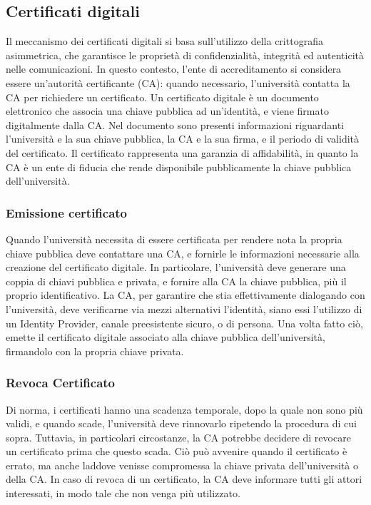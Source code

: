 \documentclass[a4paper,12pt]{article}
\begin{document}
\subsection{Certificati digitali} 
Il meccanismo dei certificati digitali si basa sull'utilizzo della crittografia asimmetrica, che garantisce le proprietà di confidenzialità, integrità ed autenticità nelle comunicazioni. 
In questo contesto, l'ente di accreditamento si considera essere un'autorità certificante (CA): quando necessario, l'università contatta la CA per richiedere un certificato.
\newline
Un certificato digitale è un documento elettronico che associa una chiave pubblica ad un'identità, e viene firmato digitalmente dalla CA. Nel documento sono presenti informazioni riguardanti l'università e la sua chiave pubblica, la CA e la sua firma, e il periodo di validità del certificato. Il certificato rappresenta una garanzia di affidabilità, in quanto la CA è un ente di fiducia che rende disponibile pubblicamente la chiave pubblica dell'università.
\subsubsection{Emissione certificato} Quando l'università necessita di essere certificata per rendere nota la propria chiave pubblica deve contattare una CA, e fornirle le informazioni necessarie alla creazione del certificato digitale. In particolare, l'università deve generare una coppia di chiavi pubblica e privata, e fornire alla CA la chiave pubblica, più il proprio identificativo. La CA, per garantire che stia effettivamente dialogando con l'università, deve verificarne via mezzi alternativi l'identità, siano essi l'utilizzo di un Identity Provider, canale preesistente sicuro, o di persona. Una volta fatto ciò, emette il certificato digitale associato alla chiave pubblica dell'università, firmandolo con la propria chiave privata.
\subsubsection{Revoca Certificato} Di norma, i certificati hanno una scadenza temporale, dopo la quale non sono più validi, e quando scade, l'università deve rinnovarlo ripetendo la procedura di cui sopra. Tuttavia, in particolari circostanze, la CA potrebbe decidere di revocare un certificato prima che questo scada. Ciò può avvenire quando il certificato è errato, ma anche laddove venisse compromessa la chiave privata dell'università o della CA. In caso di revoca di un certificato, la CA deve informare tutti gli attori interessati, in modo tale che non venga più utilizzato.
\end{document}
